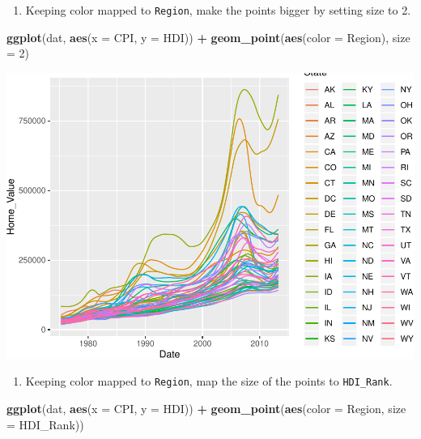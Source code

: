 \documentclass[
]{book}
\newenvironment{Shaded}{\begin{snugshade}}{\end{snugshade}}
\newcommand{\DataTypeTok}[1]{\textcolor[rgb]{0.13,0.29,0.53}{#1}}
\newcommand{\DecValTok}[1]{\textcolor[rgb]{0.00,0.00,0.81}{#1}}
\newcommand{\KeywordTok}[1]{\textcolor[rgb]{0.13,0.29,0.53}{\textbf{#1}}}
\newcommand{\NormalTok}[1]{#1}
\newcommand{\OperatorTok}[1]{\textcolor[rgb]{0.81,0.36,0.00}{\textbf{#1}}}
\newcommand{\StringTok}[1]{\textcolor[rgb]{0.31,0.60,0.02}{#1}}
\providecommand{\tightlist}{%
  \setlength{\itemsep}{0pt}\setlength{\parskip}{0pt}}
\begin{document}
\begin{alert}
\begin{enumerate}
\def\labelenumi{\arabic{enumi}.}
\setcounter{enumi}{3}
\tightlist
\item
  Keeping color mapped to \texttt{Region}, make the points bigger by setting size to 2.
\end{enumerate}

\begin{Shaded}
\begin{Highlighting}[]
\KeywordTok{ggplot}\NormalTok{(dat, }\KeywordTok{aes}\NormalTok{(}\DataTypeTok{x =}\NormalTok{ CPI, }\DataTypeTok{y =}\NormalTok{ HDI)) }\OperatorTok{+}
\StringTok{  }\KeywordTok{geom\_point}\NormalTok{(}\KeywordTok{aes}\NormalTok{(}\DataTypeTok{color =}\NormalTok{ Region), }\DataTypeTok{size =} \DecValTok{2}\NormalTok{)}
\end{Highlighting}
\end{Shaded}

\includegraphics{R/Rgraphics/figures/unnamed-chunk-177-1.pdf}

\begin{enumerate}
\def\labelenumi{\arabic{enumi}.}
\setcounter{enumi}{4}
\tightlist
\item
  Keeping color mapped to \texttt{Region}, map the size of the points to \texttt{HDI\_Rank}.
\end{enumerate}

\begin{Shaded}
\begin{Highlighting}[]
\KeywordTok{ggplot}\NormalTok{(dat, }\KeywordTok{aes}\NormalTok{(}\DataTypeTok{x =}\NormalTok{ CPI, }\DataTypeTok{y =}\NormalTok{ HDI)) }\OperatorTok{+}
\KeywordTok{geom\_point}\NormalTok{(}\KeywordTok{aes}\NormalTok{(}\DataTypeTok{color =}\NormalTok{ Region, }\DataTypeTok{size =}\NormalTok{  HDI\_Rank))}
\end{Highlighting}
\end{Shaded}


\end{alert}
\end{document}
